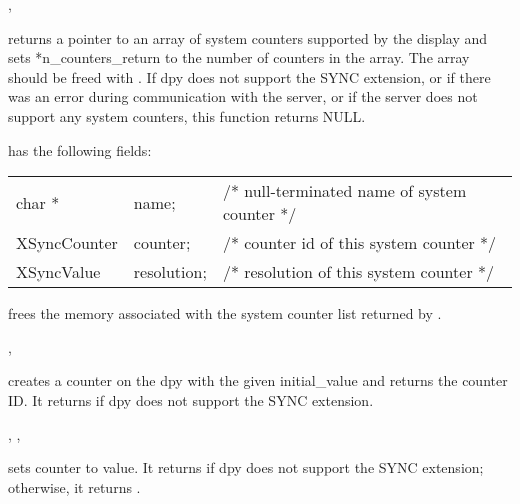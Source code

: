 ,
\cendfunctiondecl

 returns a pointer to an
array of system counters supported by the display and sets 
*n\_counters\_return to the number of
counters in the array.  The array should be freed with
.  If dpy does not
support the SYNC extension,
or if there was an error during communication with the
server, or if the server does not support any system counters, this
function returns NULL.

 has the following fields:

\begin{tabular}{lll}
char * & name; & /* null-terminated name of system counter */\\
XSyncCounter & counter; & /* counter id of this system counter */\\
XSyncValue & resolution; & /* resolution of this system counter */\\
\end{tabular}
\cendfuncdescription


\cendfunctiondecl

 frees the memory associated 
with the system counter list returned by .
\cendfuncdescription


, 
\cendfunctiondecl

 creates a counter on the dpy
with the given initial\_value and returns the counter ID. 
It returns  if dpy does not
support the SYNC extension.
\cendfuncdescription


,
,
\cendfunctiondecl

 sets counter to value.  
It returns  if dpy does not support the SYNC extension;
otherwise, it returns .
\cendfuncdescription


